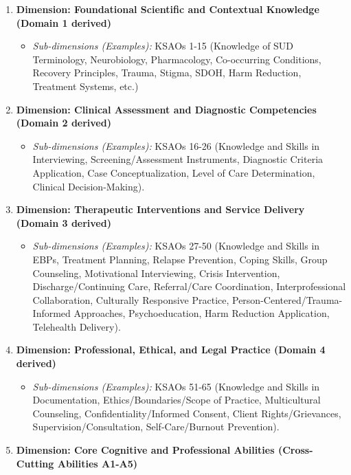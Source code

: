 \documentclass[
  letterpaper,
  DIV=11,
  numbers=noendperiod]{scrartcl}
\providecommand{\tightlist}{%
  \setlength{\itemsep}{0pt}\setlength{\parskip}{0pt}}
\begin{document}
\begin{enumerate}
\def\labelenumi{\arabic{enumi}.}
\tightlist
\item
  \textbf{Dimension: Foundational Scientific and Contextual Knowledge
  (Domain 1 derived)}

  \begin{itemize}
  \tightlist
  \item
    \emph{Sub-dimensions (Examples):} KSAOs 1-15 (Knowledge of SUD
    Terminology, Neurobiology, Pharmacology, Co-occurring Conditions,
    Recovery Principles, Trauma, Stigma, SDOH, Harm Reduction, Treatment
    Systems, etc.)
  \end{itemize}
\item
  \textbf{Dimension: Clinical Assessment and Diagnostic Competencies
  (Domain 2 derived)}

  \begin{itemize}
  \tightlist
  \item
    \emph{Sub-dimensions (Examples):} KSAOs 16-26 (Knowledge and Skills
    in Interviewing, Screening/Assessment Instruments, Diagnostic
    Criteria Application, Case Conceptualization, Level of Care
    Determination, Clinical Decision-Making).
  \end{itemize}
\item
  \textbf{Dimension: Therapeutic Interventions and Service Delivery
  (Domain 3 derived)}

  \begin{itemize}
  \tightlist
  \item
    \emph{Sub-dimensions (Examples):} KSAOs 27-50 (Knowledge and Skills
    in EBPs, Treatment Planning, Relapse Prevention, Coping Skills,
    Group Counseling, Motivational Interviewing, Crisis Intervention,
    Discharge/Continuing Care, Referral/Care Coordination,
    Interprofessional Collaboration, Culturally Responsive Practice,
    Person-Centered/Trauma-Informed Approaches, Psychoeducation, Harm
    Reduction Application, Telehealth Delivery).
  \end{itemize}
\item
  \textbf{Dimension: Professional, Ethical, and Legal Practice (Domain 4
  derived)}

  \begin{itemize}
  \tightlist
  \item
    \emph{Sub-dimensions (Examples):} KSAOs 51-65 (Knowledge and Skills
    in Documentation, Ethics/Boundaries/Scope of Practice, Multicultural
    Counseling, Confidentiality/Informed Consent, Client
    Rights/Grievances, Supervision/Consultation, Self-Care/Burnout
    Prevention).
  \end{itemize}
\item
  \textbf{Dimension: Core Cognitive and Professional Abilities
  (Cross-Cutting Abilities A1-A5)}


\end{enumerate}
\end{document}
